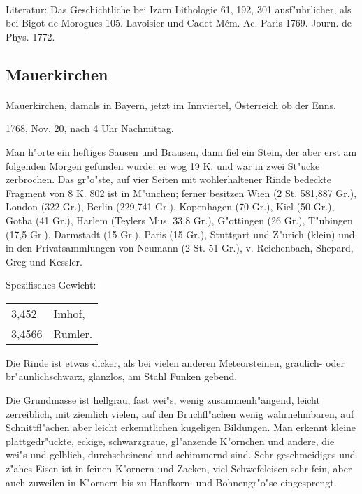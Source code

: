 \documentclass[a4paper, 11pt, oneside]{article}
\begin{document}
\paragraph{}
Literatur: Das Geschichtliche bei Izarn Lithologie 61, 192, 301 ausf"uhrlicher, als bei Bigot de Morogues 105. Lavoisier und Cadet Mém. Ac. Paris 1769. Journ. de Phys. 1772.
\subsection{Mauerkirchen}
\normalsize
\paragraph{}
Mauerkirchen, damals in Bayern, jetzt im Innviertel, Österreich ob der Enns.

1768, Nov. 20, nach 4 Uhr Nachmittag.

Man h"orte ein heftiges Sausen und Brausen, dann fiel ein Stein, der aber erst am folgenden Morgen gefunden wurde; er wog 19 K. und war in zwei St"ucke zerbrochen. Das gr"o"ste, auf vier Seiten mit wohlerhaltener Rinde bedeckte Fragment von 8 K. 802 ist in M"unchen; ferner besitzen Wien (2 St. 581,887 Gr.), London (322 Gr.), Berlin (229,741 Gr.), Kopenhagen (70 Gr.), Kiel (50 Gr.), Gotha (41 Gr.), Harlem (Teylers Mus. 33,8 Gr.), G"ottingen (26 Gr.), T"ubingen (17,5 Gr.), Darmstadt (15 Gr.), Paris (15 Gr.), Stuttgart und Z"urich (klein) und in den Privatsammlungen von Neumann (2 St. 51 Gr.), v. Reichenbach, Shepard, Greg und Kessler.

Spezifisches Gewicht:
\begin{table}[!ht]
    \centering
    \begin{tabular}{l l}
        3,452 & Imhof,\\
        3,4566 & Rumler.
    \end{tabular}
\end{table}

Die Rinde ist etwas dicker, als bei vielen anderen Meteorsteinen, graulich- oder br"aunlichschwarz, glanzlos, am Stahl Funken gebend.

Die Grundmasse ist hellgrau, fast wei"s, wenig zusammenh"angend, leicht zerreiblich, mit ziemlich vielen, auf den Bruchfl"achen wenig wahrnehmbaren, auf Schnittfl"achen aber leicht erkenntlichen kugeligen Bildungen. Man erkennt kleine plattgedr"uckte, eckige, schwarzgraue, gl"anzende K"ornchen und andere, die wei"s und gelblich, durchscheinend und schimmernd sind. Sehr geschmeidiges und z"ahes Eisen ist in feinen K"ornern und Zacken, viel Schwefeleisen sehr fein, aber auch zuweilen in K"ornern bis zu Hanfkorn- und Bohnengr"o"se eingesprengt.
\end{document}

